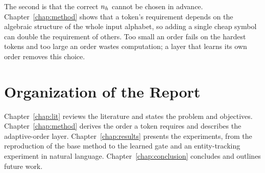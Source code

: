 The second is that the correct $n_h$ cannot be chosen in advance. Chapter~\ref{chap:method} shows that a token's requirement depends on the algebraic structure of the whole input alphabet, so adding a single cheap symbol can double the requirement of others. Too small an order fails on the hardest tokens and too large an order wastes computation; a layer that learns its own order removes this choice.

\section{Organization of the Report}
Chapter~\ref{chap:lit} reviews the literature and states the problem and objectives. Chapter~\ref{chap:method} derives the order a token requires and describes the adaptive-order layer. Chapter~\ref{chap:results} presents the experiments, from the reproduction of the base method to the learned gate and an entity-tracking experiment in natural language. Chapter~\ref{chap:conclusion} concludes and outlines future work.
